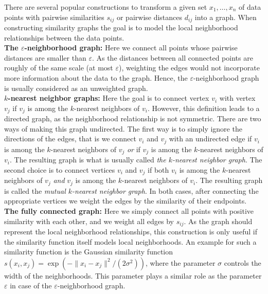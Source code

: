 \documentclass{article}
\newcommand{\norm}[1][\cdot]{\|#1\|}
\newcommand{\eps}{\ensuremath{\varepsilon}}
\begin{document}
  There are several popular constructions to transform a given set
  $x_1,\hdots,x_n$ of data points with pairwise similarities $s_{ij}$
  or pairwise distances $d_{ij}$ into a graph. When constructing
  similarity graphs the goal is to model the local neighborhood
  relationships between the data points. \\

  {\bf The $\eps$-neighborhood graph:} Here we connect all points
  whose pairwise distances are smaller than $\eps$.  As the distances
  between all connected points are roughly of the same scale (at most
  $\eps$), weighting the edges would not incorporate more information
  about the data to the graph. Hence, the $\eps$-neighborhood graph is
  usually considered as an unweighted graph. \\


{\bf $k$-nearest neighbor graphs:} Here the goal is to connect vertex
$v_i$ with vertex $v_j$ if $v_j$ is among the $k$-nearest neighbors of
$v_i$. However, this definition leads to a directed graph, as the
neighborhood relationship is not symmetric. There are two ways of
making this graph undirected. The first way is to simply ignore the
directions of the edges, that is we connect $v_i$ and $v_j$ with an
undirected 
edge if $v_i$ is among the $k$-nearest neighbors of $v_j$ {\em or} if
$v_j$ is among the $k$-nearest neighbors of $v_i$. The resulting graph
is what is usually called {\em the $k$-nearest neighbor graph}. The
second choice is to connect vertices $v_i$ and $v_j$ if both $v_i$ is
among the $k$-nearest neighbors of $v_j$ {\em and} $v_j$ is among the
$k$-nearest neighbors of $v_i$. The resulting graph is called the {\em
  mutual $k$-nearest neighbor graph}.  In both cases, after connecting
the appropriate vertices we weight the edges by the similarity of their endpoints. \\
%





{\bf The fully connected graph:} Here we simply connect all points
with positive similarity with each other, and we weight all edges by
$s_{ij}$. As the graph should represent the local neighborhood
relationships, this construction is only useful if the
similarity function itself models local neighborhoods.  An example for
such a similarity function is the Gaussian similarity function
$s(x_i,x_j) = \exp(- {\norm[x_i - x_j]^2}/({2 \sigma^2}))$, where
the parameter $\sigma$ controls the width of the neighborhoods. This
parameter plays a similar role as the parameter $\eps$ in case
of the $\eps$-neighborhood graph. \\
\end{document}
